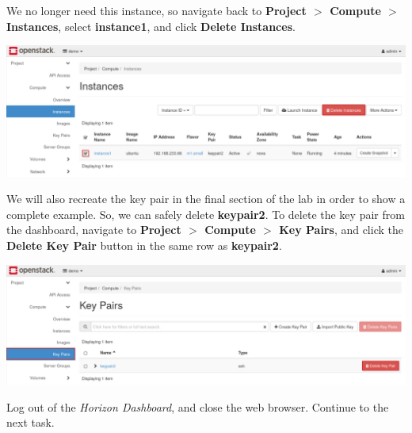 \documentclass[letterpaper, 12pt]{article}
\begin{document}
\begin{enumerate}
    \begin{labstep}
        We no longer need this instance, so navigate back to \textbf{Project $>$ Compute $>$ Instances}, select \textbf{instance1}, and click \textbf{Delete Instances}.

        \begin{center}
            \includegraphics[width=\linewidth]{images/part4/step14.png}
        \end{center}
    \end{labstep}

    \begin{labstep}
        We will also recreate the key pair in the final section of the lab in order to show a complete example.
        So, we can safely delete \textbf{keypair2}.
        To delete the key pair from the dashboard, navigate to \textbf{Project $>$ Compute $>$ Key Pairs}, and click the \textbf{Delete Key Pair} button in the same row as \textbf{keypair2}.

        \begin{center}
            \includegraphics[width=\linewidth]{images/part4/step15.png}
        \end{center}
    \end{labstep}

    \begin{labstep}
        Log out of the \textit{Horizon Dashboard}, and close the web browser.
        Continue to the next task.
    \end{labstep}

\end{enumerate}

\end{document}
